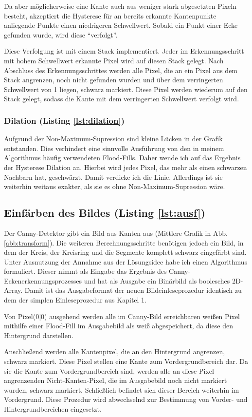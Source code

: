 Da aber möglicherweise eine Kante auch aus weniger stark abgesetzten Pixeln besteht, akzeptiert die Hysterese für an bereits erkannte Kantenpunkte anliegende Punkte einen niedrigeren Schwellwert. Sobald ein Punkt einer Ecke gefunden wurde, wird diese "`verfolgt"'.

Diese Verfolgung ist mit einem Stack implementiert. Jeder im Erkennungsschritt mit hohem Schwellwert erkannte Pixel wird auf diesen Stack gelegt. Nach Abschluss des Erkennungsschrittes werden alle Pixel, die an ein Pixel aus dem Stack angrenzen, noch nicht gefunden wurden und über dem verringerten Schwellwert von 1 liegen, schwarz markiert. Diese Pixel werden wiederum auf den Stack gelegt, sodass die Kante mit dem verringerten Schwellwert verfolgt wird. 

\subsubsection{Dilation (Listing \ref{lst:dilation})}
Aufgrund der Non-Maximum-Supression sind kleine Lücken in der Grafik entstanden. Dies verhindert eine sinnvolle Ausführung von den in meinem Algorithmus häufig verwendeten Flood-Fills. Daher wende ich auf das Ergebnis der Hysterese Dilation an. Hierbei wird jedes Pixel, das mehr als einen schwarzen Nachbarn hat, geschwärzt.
Damit verdicke ich die Linie. Allerdings ist sie weiterhin weitaus exakter, als sie es ohne Non-Maximum-Supression wäre.

\subsection{Einfärben des Bildes (Listing \ref{lst:ausf})}
Der Canny-Detektor gibt ein Bild aus Kanten aus (Mittlere Grafik in Abb. \ref{abb:transform}). Die weiteren Berechnungsschritte benötigen jedoch ein Bild, in dem der Kreis, der Kreisring und die Segmente komplett schwarz eingefärbt sind. Unter Ausnutzung der Annahme aus der Lösungsidee habe ich einen Algorithmus formuliert.
Dieser nimmt als Eingabe das Ergebnis des Canny-Eckenerkennungsprozesses und hat als Ausgabe ein Binärbild als boolesches 2D-Array. Damit ist das Ausgabeformat der neuen Bildeinleseprozedur identisch zu dem der simplen Einleseprozedur aus Kapitel 1.

Von Pixel(0|0) ausgehend werden alle im Canny-Bild erreichbaren weißen Pixel mithilfe einer Flood-Fill im Ausgabebild als weiß abgespeichert, da diese den Hintergrund darstellen.

Anschließend werden alle Kantenpixel, die an den Hintergrund angrenzen, schwarz markiert. Diese Pixel stellen eine Kante zum Vordergrundbereich dar.
Da sie die Kante zum Vordergrundbereich sind, werden alle an diese Pixel angrenzenden Nicht-Kanten-Pixel, die im Ausgabebild noch nicht markiert wurden, schwarz markiert. Schließlich befindet sich dieser Bereich weiterhin im Vordergrund.
Diese Prozedur wird abwechselnd zur Bestimmung von Vorder- und Hintergrundbereichen eingesetzt.

